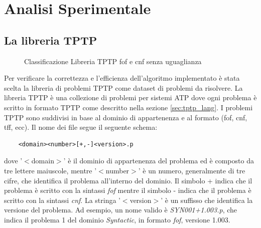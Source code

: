 \documentclass[./main.tex]{subfiles}
\begin{document}
\chapter{Analisi Sperimentale}
\section{La libreria TPTP}
\begin{figure}[h]
    \centering
    \caption{Classificazione Libreria TPTP fof e cnf senza uguaglianza}
    \label{fig:classificazione_tptp}
\end{figure}

Per verificare la correttezza e l'efficienza dell'algoritmo implementato è stata scelta 
la libreria di problemi TPTP \cite{tptpLib} come dataset di problemi da risolvere. 
La libreria TPTP è una collezione di problemi per sistemi ATP dove ogni problema è scritto in formato
TPTP come descritto nella sezione \ref{sec:tptp_lang}.
I problemi TPTP sono suddivisi in base al dominio di appartenenza e al formato (fof, cnf, tff, ecc).
Il nome dei file segue il seguente schema:
\begin{verbatim}
    <domain><number>[+,-]<version>.p
\end{verbatim}

dove '$<$domain$>$' è il dominio di appartenenza del problema ed è composto da tre lettere maiuscole, mentre
'$<$number$>$' è un numero, generalmente di tre cifre, che identifica il problema all'interno del dominio.
Il simbolo + indica che il problema è scritto con la sintassi \textit{fof} mentre il simbolo - indica
che il problema è scritto con la sintassi \textit{cnf}. La stringa '$<$version$>$' è un suffisso che
identifica la versione del problema.
Ad esempio, un nome valido è \textit{SYN001+1.003.p}, che indica il problema 1 del dominio \textit{Syntactic},
in formato \textit{fof}, versione 1.003. 
\end{document}

